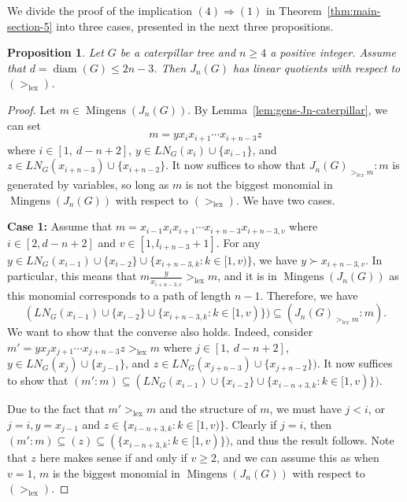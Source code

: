 \documentclass{amsart}
\newtheorem{proposition}[theorem]{Proposition}
\theoremstyle{remark}
\theoremstyle{definition}
\DeclareMathOperator{\mingens}{Mingens}
\DeclareMathOperator{\lex}{lex}
\DeclareMathOperator{\diam}{diam}
\begin{document}
    
    We divide the proof of the implication $(4)\Rightarrow (1)$ in  Theorem~\ref{thm:main-section-5} into three cases, presented in the next three propositions.
	\begin{proposition}\label{prop:LQ-2n-3}
		Let $G$ be a caterpillar tree and $n\geq 4$ a positive integer. Assume that $d=\diam(G)\leq 2n-3$. Then $J_n(G)$ has linear quotients with respect to $(>_{\lex})$.
	\end{proposition}
	\begin{proof}
		Let $m\in \mingens(J_n(G))$. By Lemma~\ref{lem:gens-Jn-caterpillar}, we can set \[m=yx_ix_{i+1}\cdots x_{i+n-3}z\]
		where $i\in [1,\ d-n+2]$, $y\in LN_G(x_i)\cup \{x_{i-1}\}$, and $z\in  LN_G(x_{i+n-3})\cup \{x_{i+n-2}\}$. It now suffices to show that $J_n(G)_{>_{lex}m} \colon m$ is generated by variables, so long as $m$ is not the biggest monomial in $\mingens(J_n(G))$ with respect to $(>_{\lex})$. We have two cases.
		
		\textbf{Case 1:} Assume that $m=x_{i-1}x_ix_{i+1}\cdots x_{i+n-3}x_{i+n-3,v}$ where $i\in [2, d-n+2]$ and $v\in [1, l_{i+n-3}+1]$. For any $y\in LN_G(x_{i-1}) \cup \{x_{i-2}\} \cup \{x_{i+n-3,k}\colon k\in [1,v)\}$, we have $y\succ x_{i+n-3,v}$. In particular, this means that  $m\frac{y}{x_{i+n-3,v}} >_{\lex}  m$, and it is in $\mingens(J_n(G))$ as this monomial corresponds to a path of length $n-1$. Therefore, we have 
		\[
		(LN_G(x_{i-1}) \cup \{x_{i-2}\} \cup \{x_{i+n-3,k}\colon k\in [1,v)\}) \subseteq (J_n(G)_{>_{lex}m}\colon m).
		\]
		We want to show that the converse also holds. Indeed, consider $m'=yx_jx_{j+1}\cdots x_{j+n-3}z>_{\lex}  m$ where $j\in [1,\ d-n+2]$, $y\in LN_G(x_j)\cup \{x_{j-1}\}$, and $z\in  LN_G(x_{j+n-3})\cup \{x_{j+n-2}\})$. It now suffices to show that $(m':m)\subseteq (LN_G(x_{i-1}) \cup \{x_{i-2}\} \cup \{x_{i-n+3,k}\colon k\in [1,v)\})$.
		
		Due to the fact that $m'>_{\lex}  m$ and the structure of $m$, we must have $j<i$, or $j=i, y=x_{j-1}$ and $z\in \{x_{i-n+3,k}\colon k\in [1,v)\}$. Clearly if $j=i$, then $(m'\colon m)\subseteq (z)\subseteq (\{x_{i-n+3,k}\colon k\in [1,v)\})$, and thus the result follows. Note that $z$ here makes sense if and only if $v\geq 2$, and we can assume this as when $v=1$, $m$ is the biggest monomial in $\mingens(J_n(G))$ with respect to $(>_{\lex})$.
		

\end{proof}
\end{document}
